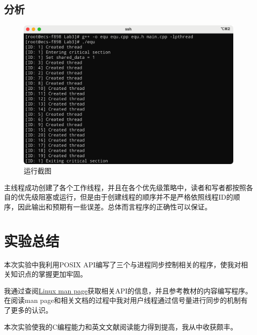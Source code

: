 \documentclass[lang=cn,11pt,a4paper,cite=authornum]{paper}
\begin{document}
\subsection{分析}

\begin{figure}[htbp]

    \centering
    \includegraphics[width=0.6\linewidth]{./images/running.png}
    \caption{运行截图}

\end{figure}

主线程成功创建了各个工作线程，并且在各个优先级策略中，读者和写者都按照各自的优先级阻塞或运行，但是由于创建线程的顺序并不是严格依照线程ID的顺序，因此输出和预期有一些误差。总体而言程序的正确性可以保证。

\section{实验总结}

本次实验中我利用POSIX API编写了三个与进程同步控制相关的程序，使我对相关知识点的掌握更加牢固。

我通过查阅\href{https:// man7.org/linux/man-pages/index.html}{Linux man page}获取相关API的信息，并且参考教材的内容编写程序。在阅读man page和相关文档的过程中我对用户线程通过信号量进行同步的机制有了更多的认识。

本次实验使我的C编程能力和英文文献阅读能力得到提高，我从中收获颇丰。
\end{document}
